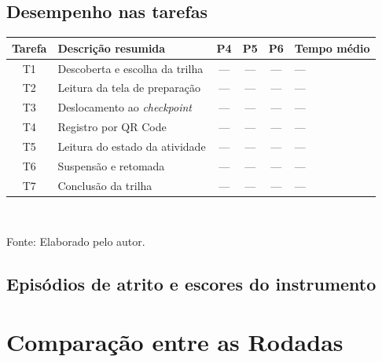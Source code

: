 \subsection{Desempenho nas tarefas}

\begin{quadro}[htb]
\centering
\caption{Conclusão das tarefas na Rodada 2}
\label{quad:res_tarefas_r2}
\footnotesize
\begin{tabular}{c p{3.2cm} c c c p{2.6cm}}
\toprule
\textbf{Tarefa} & \textbf{Descrição resumida} & \textbf{P4} & \textbf{P5} &
\textbf{P6} & \textbf{Tempo médio} \\
\midrule
T1 & Descoberta e escolha da trilha & --- & --- & --- & --- \\
T2 & Leitura da tela de preparação & --- & --- & --- & --- \\
T3 & Deslocamento ao \textit{checkpoint} & --- & --- & --- & --- \\
T4 & Registro por QR Code & --- & --- & --- & --- \\
T5 & Leitura do estado da atividade & --- & --- & --- & --- \\
T6 & Suspensão e retomada & --- & --- & --- & --- \\
T7 & Conclusão da trilha & --- & --- & --- & --- \\
\bottomrule
\end{tabular}
\\[4pt]
\begin{flushleft}
Fonte: Elaborado pelo autor.
\end{flushleft}
\end{quadro}

\subsection{Episódios de atrito e escores do instrumento}


\section{Comparação entre as Rodadas}
\label{sec:res_comparacao}


